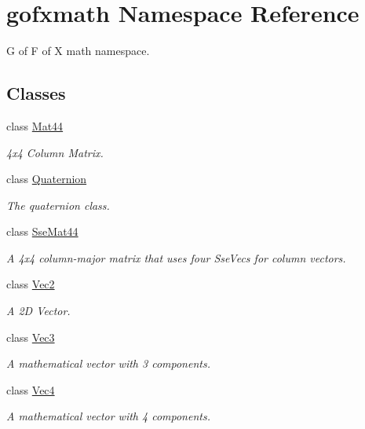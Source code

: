 \hypertarget{namespacegofxmath}{}\section{gofxmath Namespace Reference}
\label{namespacegofxmath}


G of F of X math namespace.  


\subsection*{Classes}
\begin{DoxyCompactItemize}
\item 
class \hyperlink{classgofxmath_1_1_mat44}{Mat44}
\begin{DoxyCompactList}\small\item\em 4x4 Column Matrix. \end{DoxyCompactList}\item 
class \hyperlink{classgofxmath_1_1_quaternion}{Quaternion}
\begin{DoxyCompactList}\small\item\em The quaternion class. \end{DoxyCompactList}\item 
class \hyperlink{classgofxmath_1_1_sse_mat44}{Sse\+Mat44}
\begin{DoxyCompactList}\small\item\em A 4x4 column-\/major matrix that uses four Sse\+Vecs for column vectors. \end{DoxyCompactList}\item 
class \hyperlink{classgofxmath_1_1_vec2}{Vec2}
\begin{DoxyCompactList}\small\item\em A 2\+D Vector. \end{DoxyCompactList}\item 
class \hyperlink{classgofxmath_1_1_vec3}{Vec3}
\begin{DoxyCompactList}\small\item\em A mathematical vector with 3 components. \end{DoxyCompactList}\item 
class \hyperlink{classgofxmath_1_1_vec4}{Vec4}
\begin{DoxyCompactList}\small\item\em A mathematical vector with 4 components. \end{DoxyCompactList}\end{DoxyCompactItemize}

